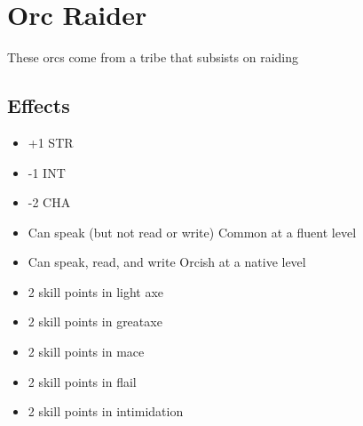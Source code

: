 \section{Orc Raider}\label{culture:orc-raider}
These orcs come from a tribe that subsists on raiding

\subsection*{Effects}
\begin{itemize}
    \item +1 STR
    \item -1 INT
    \item -2 CHA
    \item Can speak (but not read or write) Common at a fluent level
    \item Can speak, read, and write Orcish at a native level
    \item 2 skill points in light axe
    \item 2 skill points in greataxe
    \item 2 skill points in mace
    \item 2 skill points in flail
    \item 2 skill points in intimidation
\end{itemize}
